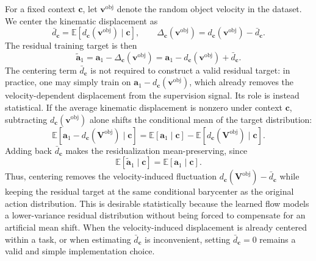 \documentclass[10pt,twocolumn,letterpaper]{article}
\begin{document}
For a fixed context $\mathbf c$, let $\mathbf v^{\mathrm{obj}}$ denote the random object
velocity in the dataset. We center the kinematic displacement as
\[
    \bar d_{\mathbf c}
    =
    \mathbb E[d_{\mathbf c}(\mathbf v^{\mathrm{obj}})\mid\mathbf c],
    \qquad
    \Delta_{\mathbf c}(\mathbf v^{\mathrm{obj}})
    =
    d_{\mathbf c}(\mathbf v^{\mathrm{obj}})-\bar d_{\mathbf c}.
\]
The residual training target is then
\begin{equation}
    \widetilde{\mathbf a}_1
    =
    \mathbf a_1-\Delta_{\mathbf c}(\mathbf v^{\mathrm{obj}})
    =
    \mathbf a_1-d_{\mathbf c}(\mathbf v^{\mathrm{obj}})+\bar d_{\mathbf c}.
    \label{eq:residual_target}
\end{equation}
The centering term $\bar d_{\mathbf c}$ is not required to construct a valid
residual target: in practice, one may simply train on
$\mathbf a_1-d_{\mathbf c}(\mathbf v^{\mathrm{obj}})$, which already removes the
velocity-dependent displacement from the supervision signal. Its role is instead
statistical. If the average kinematic displacement is nonzero under context
$\mathbf c$, subtracting $d_{\mathbf c}(\mathbf v^{\mathrm{obj}})$ alone shifts the
conditional mean of the target distribution:
\[
    \mathbb E[\mathbf a_1-d_{\mathbf c}(\mathbf V^{\mathrm{obj}})\mid \mathbf c]
    =
    \mathbb E[\mathbf a_1\mid \mathbf c]
    -
    \mathbb E[d_{\mathbf c}(\mathbf V^{\mathrm{obj}})\mid \mathbf c].
\]
Adding back $\bar d_{\mathbf c}$ makes the residualization mean-preserving,
since
\[
    \mathbb E[\widetilde{\mathbf a}_1\mid \mathbf c]
    =
    \mathbb E[\mathbf a_1\mid \mathbf c].
\]
Thus, centering removes the velocity-induced fluctuation
$d_{\mathbf c}(\mathbf V^{\mathrm{obj}})-\bar d_{\mathbf c}$ while keeping the residual
target at the same conditional barycenter as the original action distribution.
This is desirable statistically because the learned flow models a lower-variance
residual distribution without being forced to compensate for an artificial mean
shift. When the velocity-induced displacement is already centered within a task,
or when estimating $\bar d_{\mathbf c}$ is inconvenient, setting
$\bar d_{\mathbf c}=0$ remains a valid and simple implementation choice.
\end{document}
